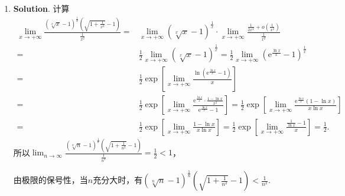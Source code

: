 \documentclass[../main.tex]{subfiles}
\begin{document}
\begin{enumerate}
    \item \textbf{Solution}. 计算
          \[
              \begin{aligned}
                  \lim_{x\to+\infty}\frac{\left(\sqrt[x]{x}-1\right)^{\frac{1}{x}}\left(\sqrt{1+\frac{1}{x^2}}-1\right)}{\frac{1}{x^2}}= {} & \lim_{x\to+\infty}\left(\sqrt[x]{x}-1\right)^{\frac{1}{x}}\cdot\lim_{x\to+\infty}\frac{\frac{1}{2x^2}+o\left(\frac{1}{x^2}\right)}{\frac{1}{x^2}}                                                                                              \\
                  = {}                                                                                                                      & \frac{1}{2}\lim_{x\to+\infty}\left(\sqrt[x]{x}-1\right)^{\frac{1}{x}}=\frac{1}{2}\lim_{x\to+\infty}\left(\mathrm{e}^{\frac{\ln x}{x}}-1\right)^{\frac{1}{x}}                                                                                   \\
                  = {}                                                                                                                      & \frac{1}{2}\exp\left[\lim_{x\to+\infty}\frac{\ln\left(\mathrm{e}^{\frac{\ln x}{x}}-1\right)}{x}\right]                                                                                                                                         \\
                  = {}                                                                                                                      & \frac{1}{2}\exp\left[\lim_{x\to+\infty}\frac{\mathrm{e}^{\frac{\ln x}{x}}\cdot\frac{1-\ln x}{x^2}}{\mathrm{e}^{\frac{\ln x}{x}}-1}\right] = \frac{1}{2}\exp\left[\lim_{x\to+\infty}\frac{\mathrm{e}^{\frac{\ln x}{x}}(1-\ln x)}{x\ln x}\right] \\
                  = {}                                                                                                                      & \frac{1}{2}\exp\left[\lim_{x\to+\infty}\frac{1-\ln x}{x\ln x}\right] = \frac{1}{2}\exp\left[\lim_{x\to+\infty}\frac{\frac{1}{\ln x}-1}{x}\right]=\frac{1}{2}.
              \end{aligned}
          \]
          所以$\lim_{n\to\infty}\frac{\left(\sqrt[n]{n}-1\right)^{\frac{1}{n}}\left(\sqrt{1+\frac{1}{n^2}}-1\right)}{\frac{1}{n^{2}}}
              =\frac{1}{2}<1$，

          由极限的保号性，当$n$充分大时，有$\left(\sqrt[n]{n}-1\right)^{\frac{1}{n}}\left
              (\sqrt{1+\frac{1}{n^{2}}}-1\right)<\frac{1}{n^{2}}$.


\end{enumerate}
\end{document}
